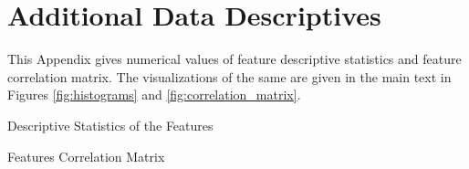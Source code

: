 \chapter{Additional Data Descriptives}
\label{chap:additional_figures} 

This Appendix gives numerical values of feature descriptive statistics and feature correlation matrix. The visualizations of the same are given in the main text in Figures \ref{fig:histograms} and \ref{fig:correlation_matrix}.
 
\begin{table}
	\resizebox{\textwidth}{!}{}
	\caption{Descriptive Statistics of the Features}
	\label{tab:descriptives}
\end{table} 
 
\begin{sidewaystable}
	\begin{adjustbox}{scale=0.4,center}
		
	\end{adjustbox}
	\caption{Features Correlation Matrix}
	\label{tab:correlation_matrix}
\end{sidewaystable}



